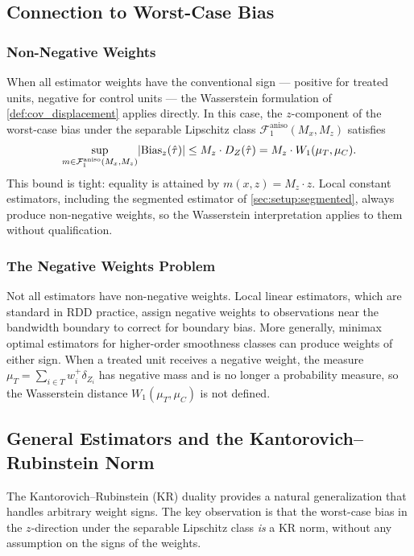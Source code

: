 \subsection{Connection to Worst-Case Bias}\label{sec:appendix:zdisplacement:bias}

\subsubsection*{Non-Negative Weights}

When all estimator weights have the conventional sign --- positive for treated units, negative for control units --- the Wasserstein formulation of \cref{def:cov_displacement} applies directly.
In this case, the $z$-component of the worst-case bias under the separable Lipschitz class $\mathcal{F}_1^{\mathrm{aniso}}(M_x, M_z)$ satisfies
\begin{equation}\label{eq:bias_bound_z}
	\sup_{m \in \mathcal{F}_1^{\mathrm{aniso}}(M_x, M_z)} \lvert\text{Bias}_z(\hat{\tau})\rvert \leq M_z \cdot D_Z(\hat{\tau}) = M_z \cdot W_1(\mu_T, \mu_C).
\end{equation}
This bound is tight: equality is attained by $m(x,z) = M_z \cdot z$.
Local constant estimators, including the segmented estimator of \cref{sec:setup:segmented}, always produce non-negative weights, so the Wasserstein interpretation applies to them without qualification.


\subsubsection*{The Negative Weights Problem}

Not all estimators have non-negative weights.
Local linear estimators, which are standard in RDD practice, assign negative weights to observations near the bandwidth boundary to correct for boundary bias.
More generally, minimax optimal estimators for higher-order smoothness classes can produce weights of either sign.
When a treated unit receives a negative weight, the measure $\mu_T = \sum_{i \in T} w_i^+ \delta_{Z_i}$ has negative mass and is no longer a probability measure, so the Wasserstein distance $W_1(\mu_T, \mu_C)$ is not defined.


\subsection{General Estimators and the Kantorovich--Rubinstein Norm}\label{sec:appendix:zdisplacement:kr}

The Kantorovich--Rubinstein (KR) duality provides a natural generalization that handles arbitrary weight signs.
The key observation is that the worst-case bias in the $z$-direction under the separable Lipschitz class \emph{is} a KR norm, without any assumption on the signs of the weights.

